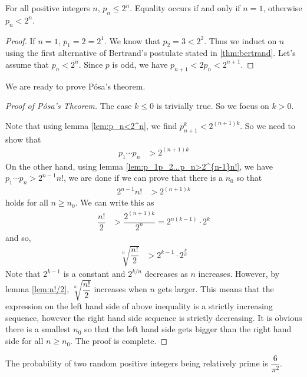 \begin{lemma}
	For all positive integers $n$, $p_{n}\leq 2^{n}$. Equality occurs if and only if $n=1$, otherwise $p_n<2^n$.\label{lem:p_n<2^n}
\end{lemma}

\begin{proof}
	If $n=1$, $p_1=2=2^1$. We know that $p_2=3<2^2$. Thus we induct on $n$ using the first alternative of Bertrand's postulate stated in \autoref{thm:bertrand}. Let's assume that $p_n<2^n$. Since $p$ is odd, we have $p_{n+1}<2p_n<2^{n+1}$.
\end{proof}

We are ready to prove P\'{o}sa's theorem.

\begin{proof}[Proof of P\'osa's Theorem]
	The case $k\leq0$ is trivially true. So we focus on $k>0$.

	Note that using lemma \eqref{lem:p_n<2^n}, we find $p_{n+1}^k<2^{(n+1)k}$. So we need to show that
		\begin{align*}
			p_1\cdots p_n & > 2^{(n+1)k}
		\end{align*}
	On the other hand, using lemma \eqref{lem:p_1p_2...p_n>2^{n-1}n!}, we have $p_1\cdots p_n > 2^{n-1}n!$, we are done if we can prove that there is a $n_0$ so that
		\begin{align*}
			2^{n-1}n! & >2^{(n+1)k}
		\end{align*}
	holds for all $n\geq n_0$. We can write this as
		\begin{align*}
			\dfrac{n!}{2} & >\dfrac{2^{(n+1)k}}{2^n} =2^{n(k-1)}\cdot2^k
		\end{align*}
	and so,
		\begin{align*}
			\sqrt[n]{\dfrac{n!}{2}}&>2^{k-1}\cdot2^{\frac{k}{n}}
		\end{align*}
	Note that $2^{k-1}$ is a constant and $2^{k/n}$ decreases as $n$ increases. However, by lemma \eqref{lem:n!/2}, $\sqrt[n]{\dfrac{n!}{2}}$ increases when $n$ gets larger. This means that the expression on the left hand side of above inequality is a strictly increasing sequence, however the right hand side sequence is strictly decreasing. It is obvious there is a smallest $n_0$ so that the left hand side gets bigger than the right hand side for all $n\geq n_0$. The proof is complete.
\end{proof}

\begin{theorem}
	The probability of two random positive integers being relatively prime is $\dfrac{6}{\pi^2}$.
\end{theorem}

